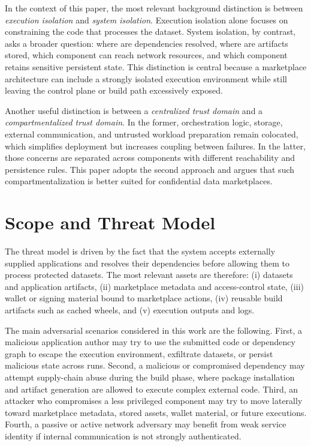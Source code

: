 \documentclass[sigconf,nonacm]{acmart}
\begin{document}
In the context of this paper, the most relevant background distinction is between \emph{execution isolation} and \emph{system isolation}. Execution isolation alone focuses on constraining the code that processes the dataset. System isolation, by contrast, asks a broader question: where are dependencies resolved, where are artifacts stored, which component can reach network resources, and which component retains sensitive persistent state. This distinction is central because a marketplace architecture can include a strongly isolated execution environment while still leaving the control plane or build path excessively exposed.

Another useful distinction is between a \emph{centralized trust domain} and a \emph{compartmentalized trust domain}. In the former, orchestration logic, storage, external communication, and untrusted workload preparation remain colocated, which simplifies deployment but increases coupling between failures. In the latter, those concerns are separated across components with different reachability and persistence rules. This paper adopts the second approach and argues that such compartmentalization is better suited for confidential data marketplaces.

\section{Scope and Threat Model}

The threat model is driven by the fact that the system accepts externally supplied applications and resolves their dependencies before allowing them to process protected datasets. The most relevant assets are therefore: (i) datasets and application artifacts, (ii) marketplace metadata and access-control state, (iii) wallet or signing material bound to marketplace actions, (iv) reusable build artifacts such as cached wheels, and (v) execution outputs and logs.

The main adversarial scenarios considered in this work are the following. First, a malicious application author may try to use the submitted code or dependency graph to escape the execution environment, exfiltrate datasets, or persist malicious state across runs. Second, a malicious or compromised dependency may attempt supply-chain abuse during the build phase, where package installation and artifact generation are allowed to execute complex external code. Third, an attacker who compromises a less privileged component may try to move laterally toward marketplace metadata, stored assets, wallet material, or future executions. Fourth, a passive or active network adversary may benefit from weak service identity if internal communication is not strongly authenticated.
\end{document}
